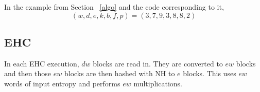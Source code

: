 \documentclass[runningheads]{llncs}
\begin{document}
In the example from Section ~\ref{algo} and the code corresponding to it, \[(w, d, e, k, b, f, p) = (3, 7, 9, 3, 8, 8, 2)\]

\subsection{EHC}




In each EHC execution, $d w$ blocks are read in.
They are converted to $e w$ blocks and then those $e w$ blocks are then hashed with NH to $e$ blocks.
This uses $e w$ words of input entropy and performs $e w$ multiplications.


\end{document}
